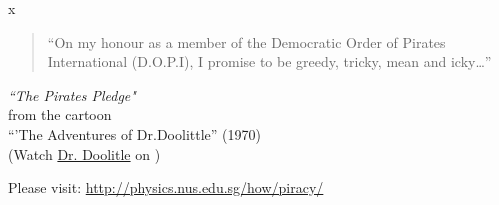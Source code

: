 


{%
\renewcommand\fsection[1]{}
\def\acroCol{\color{black}}
}

{
\begin{myFrame}{}{x}
\medskip

\small
\begin{quote}
``On my honour as a member of the Democratic Order of Pirates International (D.O.P.I), I promise to be greedy, tricky, mean and icky\ldots''
\end{quote}

\begin{flushright}
\scriptsize
\emph{ ``The Pirates Pledge"}\\
from the cartoon \\``'The Adventures of Dr.Doolittle'' (1970) \\[5pt]
\tiny (Watch \href{https://youtu.be/SQtMMYGTNz8}{Dr. Doolitle} on \you[0.04]{})
\end{flushright}

\end{myFrame}

\begin{myFrame}{}{}
\maketitle
\vfill
\begin{center}
	\small Please visit:
\url{http://physics.nus.edu.sg/how/piracy/}
\end{center}

\end{myFrame}
}

